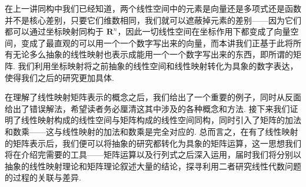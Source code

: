 \begin{summary}

    在上一讲同构中我们已经知道，两个线性空间中的元素是向量还是多项式还是函数并不是核心差别，只要它们维数相同，我们就可以遮蔽掉元素的差别——因为它们都可以通过坐标映射同构于 $\mathbf{R}^n$，因此一切线性空间在坐标作用下都变成了向量空间，变成了最直观的可以用一个一个数字写出来的向量，而本讲我们正基于此将所有无论多么抽象的线性映射也表示成能用一个一个数字写出来的东西，即所谓的矩阵. 我们利用坐标映射将之前抽象的线性空间和线性映射转化为具象的数字表达，使得我们之后的研究更加具体.

    在理解了线性映射矩阵表示的概念之后，我们给出了一个重要的例子，同时从反面给出了错误解法，希望读者务必厘清这其中涉及的各种概念和方法. 接下来我们证明了线性映射构成的线性空间与矩阵构成的线性空间同构，同时引入了矩阵的加法和数乘——这与线性映射的加法和数乘是完全对应的. 总而言之，在有了线性映射的矩阵表示后，我们便可以将抽象的研究都转化为具象的矩阵运算，这一思想我们将在介绍完需要的工具——矩阵运算以及行列式之后深入运用，届时我们将分别以抽象的线性映射理论和矩阵理论叙述大量的结论，探寻利用二者研究线性代数问题的过程的关联与差异.

\end{summary}

